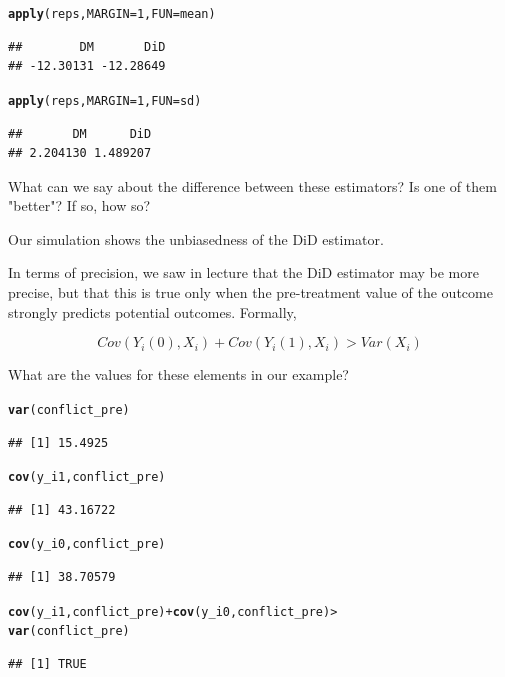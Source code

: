 \documentclass[12 pt]{article}\usepackage[]{graphicx}\usepackage[]{color}
\makeatletter
\newcommand{\hlnum}[1]{\textcolor[rgb]{0.686,0.059,0.569}{#1}}%
\newcommand{\hlopt}[1]{\textcolor[rgb]{0,0,0}{#1}}%
\newcommand{\hlstd}[1]{\textcolor[rgb]{0.345,0.345,0.345}{#1}}%
\newcommand{\hlkwc}[1]{\textcolor[rgb]{0.333,0.667,0.333}{#1}}%
\newcommand{\hlkwd}[1]{\textcolor[rgb]{0.737,0.353,0.396}{\textbf{#1}}}%
\newenvironment{kframe}{%
 \def\at@end@of@kframe{}%
 \ifinner\ifhmode%
  \def\at@end@of@kframe{\end{minipage}}%
  \begin{minipage}{\columnwidth}%
 \fi\fi%
 \def\FrameCommand##1{\hskip\@totalleftmargin \hskip-\fboxsep
 \colorbox{shadecolor}{##1}\hskip-\fboxsep
     \hskip-\linewidth \hskip-\@totalleftmargin \hskip\columnwidth}%
 \MakeFramed {\advance\hsize-\width
   \@totalleftmargin\z@ \linewidth\hsize
   \@setminipage}}%
 {\par\unskip\endMakeFramed%
 \at@end@of@kframe}
\newenvironment{knitrout}{}{} %
\makeatother
\begin{document}
\begin{knitrout}
\color{fgcolor}\begin{kframe}
\begin{alltt}
\hlkwd{apply}\hlstd{(reps,} \hlkwc{MARGIN} \hlstd{=} \hlnum{1}\hlstd{,} \hlkwc{FUN} \hlstd{= mean)}
\end{alltt}
\begin{verbatim}
##        DM       DiD 
## -12.30131 -12.28649
\end{verbatim}
\begin{alltt}
\hlkwd{apply}\hlstd{(reps,} \hlkwc{MARGIN} \hlstd{=} \hlnum{1}\hlstd{,} \hlkwc{FUN} \hlstd{= sd)}
\end{alltt}
\begin{verbatim}
##       DM      DiD 
## 2.204130 1.489207
\end{verbatim}
\end{kframe}
\end{knitrout}

What can we say about the difference between these estimators? Is one of them "better"? If so, how so?

Our simulation shows the unbiasedness of the DiD estimator. 

In terms of precision, we saw in lecture that the DiD estimator may be more precise, but that this is true only when the pre-treatment value of the outcome strongly predicts potential outcomes. Formally, 

$$ Cov(Y_i(0), X_i) + Cov(Y_i(1), X_i) > Var(X_i) $$

What are the values for these elements in our example?
\begin{knitrout}
\color{fgcolor}\begin{kframe}
\begin{alltt}
\hlkwd{var}\hlstd{(conflict_pre)}
\end{alltt}
\begin{verbatim}
## [1] 15.4925
\end{verbatim}
\begin{alltt}
\hlkwd{cov}\hlstd{(y_i1, conflict_pre)}
\end{alltt}
\begin{verbatim}
## [1] 43.16722
\end{verbatim}
\begin{alltt}
\hlkwd{cov}\hlstd{(y_i0, conflict_pre)}
\end{alltt}
\begin{verbatim}
## [1] 38.70579
\end{verbatim}
\begin{alltt}
\hlkwd{cov}\hlstd{(y_i1, conflict_pre)} \hlopt{+} \hlkwd{cov}\hlstd{(y_i0, conflict_pre)} \hlopt{>}
    \hlkwd{var}\hlstd{(conflict_pre)}
\end{alltt}
\begin{verbatim}
## [1] TRUE
\end{verbatim}
\end{kframe}
\end{knitrout}
\end{document}
